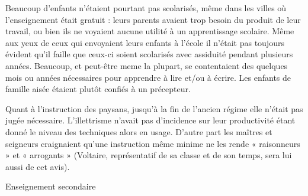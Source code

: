 Beaucoup d'enfants n'étaient pourtant pas scolarisés, même dans les villes où l'enseignement était gratuit : leurs parents avaient trop besoin du produit de leur travail, ou bien ils ne voyaient aucune utilité à un apprentissage scolaire. Même aux yeux de ceux qui envoyaient leurs enfants à l'école il n'était pas toujours évident qu'il faille que ceux-ci soient scolarisés avec assiduité pendant plusieurs années. Beaucoup, et peut-être meme la plupart, se contentaient des quelques mois ou années nécessaires pour apprendre à lire et/ou à écrire. Les enfants de famille aisée étaient plutôt confiés à un précepteur.  

 Quant à l'instruction des paysans, jusqu'à la fin de l'ancien régime elle n'était pas jugée nécessaire. L'illettrisme n'avait pas d'incidence sur leur productivité étant donné le niveau des techniques alors en usage. D'autre part les maîtres et seigneurs craignaient qu'une instruction même minime ne les rende « raisonneurs » et « arrogants » (Voltaire, représentatif de sa classe et de son temps, sera lui aussi de cet avis).

Enseignement secondaire 

